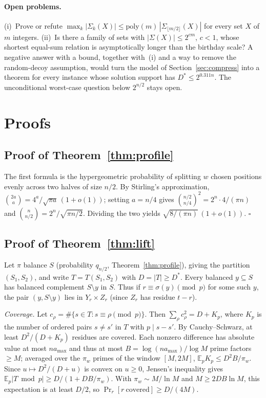 \documentclass[conference]{IEEEtran}
\begin{document}
\paragraph*{Open problems.}
(i)~Prove or refute $\max_k|\Sigma_k(X)|\le\mathrm{poly}(m)\,|\Sigma_{\lfloor m/2\rfloor}(X)|$
for every set $X$ of $m$ integers. (ii)~Is there a family of sets with
$|\Sigma(X)|\le2^{cm}$, $c<1$, whose shortest equal-sum relation is asymptotically longer than
the birthday scale? A negative answer with a bound, together with~(i) and a way to remove the
random-decoy assumption, would turn the model of Section~\ref{sec:compress} into a theorem for
every instance whose solution support has $D^*\le2^{0.311n}$. The unconditional worst-case
question below $2^{n/2}$ stays open.

\appendices
\section{Proofs}\label{app:proofs}

\subsection{Proof of Theorem~\ref{thm:profile}}
The first formula is the hypergeometric probability of splitting $w$ chosen
positions evenly across two halves of size $n/2$. By Stirling's approximation,
$\binom{2a}{a}=4^a/\sqrt{\pi a}\,(1+o(1))$; setting $a=n/4$ gives
$\binom{n/2}{n/4}^2=2^n\cdot 4/(\pi n)$ and $\binom{n}{n/2}=2^n/\sqrt{\pi n/2}$.
Dividing the two yields $\sqrt{8/(\pi n)}\,(1+o(1))$. \hfill$\square$

\subsection{Proof of Theorem~\ref{thm:lift}}
Let $\pi$ balance $S$ (probability $q_{n/2}$, Theorem~\ref{thm:profile}), giving the
partition $(S_1,S_2)$, and write $T=T(S_1,S_2)$ with $D=|T|\ge D^*$. Every balanced
$y\subseteq S$ has balanced complement $S\setminus y$ in $S$. Thus if
$r\equiv\sigma(y)\pmod p$ for some such $y$, the pair $(y,S\setminus y)$ lies in
$Y_r\times Z_r$ (since $Z_r$ has residue $t-r$).

\emph{Coverage.} Let $c_\rho=\#\{s\in T:s\equiv\rho\pmod p\}$. Then
$\sum_\rho c_\rho^2=D+K_p$, where $K_p$ is the number of ordered pairs $s\ne s'$ in $T$
with $p\mid s-s'$. By Cauchy--Schwarz, at least $D^2/(D+K_p)$ residues are
covered. Each nonzero difference has absolute value at most $n a_{\max}$ and thus at most
$B=\log(na_{\max})/\log M$ prime factors $\ge M$; averaged over the $\pi_w$
primes of the window $[M,2M]$, $\mathbb E_p K_p\le D^2B/\pi_w$. Since
$u\mapsto D^2/(D+u)$ is convex on $u\ge 0$, Jensen's inequality gives
$\mathbb E_p|T\bmod p|\ge D/(1+DB/\pi_w)$. With $\pi_w\sim M/\ln M$ and
$M\ge 2DB\ln M$, this expectation is at least $D/2$, so $\Pr_r[r\ \text{covered}]\ge D/(4M)$.
\end{document}
